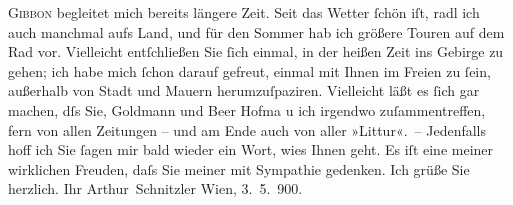 \begin{ledgroupsized}[t]{13cm}
                  \textsc{Gibbon} begleitet mich bereits längere Zeit.\pend
           \pstart
           Seit das Wetter ſchön iſt, radl ich auch manchmal aufs Land, und für den Sommer hab
               ich {\pb}größere Touren auf dem Rad vor. Vielleicht
               entſchließen Sie ſich einmal, in der heißen Zeit ins Gebirge zu gehen; ich habe mich
               ſchon darauf  gefreut,
               einmal mit Ihnen im Freien zu ſein, außerhalb von Stadt und Mauern herumzuſpaziren.
               Vielleicht läßt es ſich gar machen, dſs Sie, Goldmann und Beer Hofma{\geminationn} u ich irgendwo zuſammentreffen, fern von allen Zeitungen – und am Ende auch von
               aller »Lit\damage{\textcolor{gray}{era}}tur«. –\pend
           \pstart
           Jedenfalls hoff ich Sie ſagen mir bald wieder ein Wort, wies Ihnen {\pb}geht. Es iſt eine meiner wirklichen Freuden, daſs
               Sie meiner mit Sympathie gedenken. Ich grüße Sie herzlich.\pend
           \pstart Ihr \spacefill\mbox{Arthur Schnitzler}\pend{}\pstart
           Wien, 3. 5. 900.\pend
           \endnumbering{}\end{ledgroupsized}  \newcommand{\dateiname}{L01034}\newcommand{\titel}{Arthur Schnitzler an Georg Brandes, 3. 5. 1900}\newcommand{\editorInnen}{Martin Anton Müller und Gerd-Hermann Susen}
            \footnotesize
\begin{ledgroupsized}[t]{11.5cm}
\end{ledgroupsized}
         
      